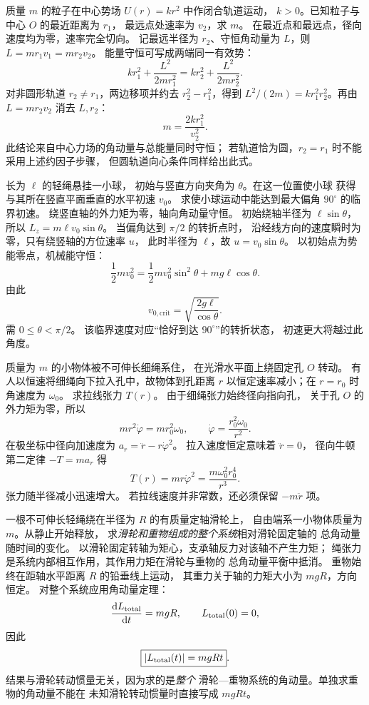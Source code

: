 质量 $m$ 的粒子在中心势场 $U(r)=kr^2$ 中作闭合轨道运动，
$k>0$。已知粒子与中心 $O$ 的最近距离为 $r_1$，
最远点处速率为 $v_2$，求 $m$。
\exsolution
在最近点和最远点，径向速度均为零，速率完全切向。
记最远半径为 $r_2$、守恒角动量为 $L$，则
$L=mr_1v_1=mr_2v_2$。
能量守恒可写成两端同一有效势：
\[
kr_1^2+\frac{L^2}{2mr_1^2}
=kr_2^2+\frac{L^2}{2mr_2^2}.
\]
对非圆形轨道 $r_2\ne r_1$，两边移项并约去
$r_2^2-r_1^2$，得到
$L^2/(2m)=kr_1^2r_2^2$。再由
$L=mr_2v_2$ 消去 $L,r_2$：
\[
\boxed{m=\frac{2kr_1^2}{v_2^2}}.
\]
\excheck 此结论来自中心力场的角动量与总能量同时守恒；
若轨道恰为圆，$r_2=r_1$ 时不能采用上述约因子步骤，
但圆轨道向心条件同样给出此式。

长为 $\ell$ 的轻绳悬挂一小球，
初始与竖直方向夹角为 $\theta$。在这一位置使小球
获得与其所在竖直平面垂直的水平初速 $v_0$。
求使小球运动中能达到最大偏角 $90^\circ$ 的临界初速。
\exsolution
绕竖直轴的外力矩为零，轴向角动量守恒。
初始绕轴半径为 $\ell\sin\theta$，所以
$L_z=m\ell v_0\sin\theta$。
当偏角达到 $\pi/2$ 的转折点时，
沿经线方向的速度瞬时为零，只有绕竖轴的方位速率 $u$，
此时半径为 $\ell$，故
$u=v_0\sin\theta$。
以初始点为势能零点，机械能守恒：
\[
\frac12mv_0^2
=\frac12m v_0^2\sin^2\theta+mg\ell\cos\theta.
\]
由此
\[
\boxed{v_{0,\mathrm{crit}}=
\sqrt{\frac{2g\ell}{\cos\theta}}}.
\]
\excheck 需 $0\le\theta<\pi/2$。
该临界速度对应“恰好到达 $90^\circ$”的转折状态，
初速更大将越过此角度。

质量为 $m$ 的小物体被不可伸长细绳系住，
在光滑水平面上绕固定孔 $O$ 转动。
有人以恒速将细绳向下拉入孔中，故物体到孔距离
$r$ 以恒定速率减小；在 $r=r_0$ 时角速度为 $\omega_0$。
求拉线张力 $T(r)$。
\exsolution
由于细绳张力始终径向指向孔，
关于孔 $O$ 的外力矩为零，所以
\[
mr^2\dot\varphi=mr_0^2\omega_0,\qquad
\dot\varphi=\frac{r_0^2\omega_0}{r^2}.
\]
在极坐标中径向加速度为
$a_r=\ddot r-r\dot\varphi^2$。
拉入速度恒定意味着 $\ddot r=0$，
径向牛顿第二定律 $-T=ma_r$ 得
\[
\boxed{T(r)=mr\dot\varphi^2
=\frac{m\omega_0^2r_0^4}{r^3}}.
\]
\excheck 张力随半径减小迅速增大。
若拉线速度并非常数，还必须保留 $-m\ddot r$ 项。

一根不可伸长轻绳绕在半径为 $R$ 的有质量定轴滑轮上，
自由端系一小物体质量为 $m$。从静止开始释放，
求\emph{滑轮和重物组成的整个系统}相对滑轮固定轴的
总角动量随时间的变化。
\exsolution
以滑轮固定转轴为矩心，支承轴反力对该轴不产生力矩；
绳张力是系统内部相互作用，其作用力矩在滑轮与重物的
总角动量平衡中抵消。
重物始终在距轴水平距离 $R$ 的铅垂线上运动，
其重力关于轴的力矩大小为 $mgR$，方向恒定。
对整个系统应用角动量定理：
\[
\frac{\mathrm dL_{\rm total}}{\mathrm dt}=mgR,
\qquad L_{\rm total}(0)=0,
\]
因此
\[
\boxed{|L_{\rm total}(t)|=mgRt}.
\]
\excheck 结果与滑轮转动惯量无关，因为求的是\emph{整个}
滑轮—重物系统的角动量。单独求重物的角动量不能在
未知滑轮转动惯量时直接写成 $mgRt$。

